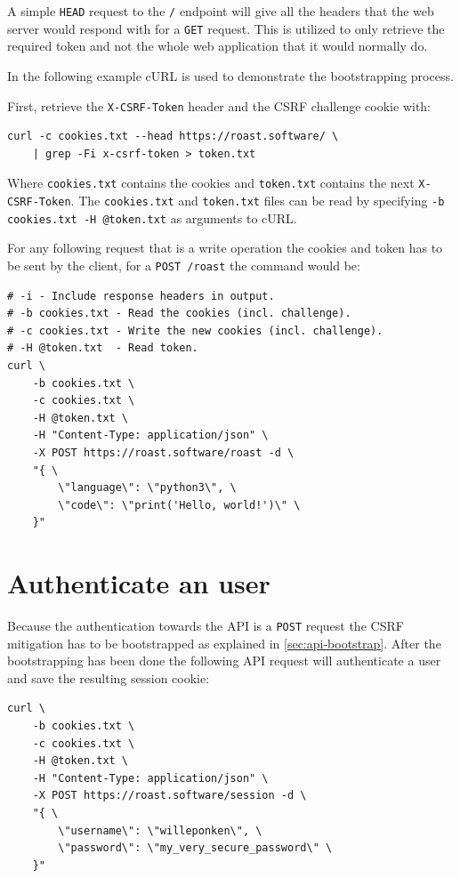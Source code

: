 \documentclass[12pt,a4paper]{report}
\begin{document}
A simple \texttt{HEAD} request to the \texttt{/} endpoint will give all the headers that the web server would respond with for a \texttt{GET} request. This is utilized to only retrieve the required token and not the whole web application that it would normally do.

In the following example cURL is used to demonstrate the bootstrapping process.

First, retrieve the \texttt{X-CSRF-Token} header and the CSRF challenge cookie with:
\begin{verbatim}
curl -c cookies.txt --head https://roast.software/ \
    | grep -Fi x-csrf-token > token.txt
\end{verbatim}
Where \texttt{cookies.txt} contains the cookies and \texttt{token.txt} contains the next \texttt{X-CSRF-Token}.
The \texttt{cookies.txt} and \texttt{token.txt} files can be read by specifying \texttt{-b cookies.txt -H @token.txt} as arguments to cURL.

\newpage
For any following request that is a write operation the cookies and token has to be sent by the client, for a \texttt{POST /roast} the command would be:
\begin{verbatim}
# -i - Include response headers in output.
# -b cookies.txt - Read the cookies (incl. challenge).
# -c cookies.txt - Write the new cookies (incl. challenge).
# -H @token.txt  - Read token.
curl \
    -b cookies.txt \
    -c cookies.txt \
    -H @token.txt \
    -H "Content-Type: application/json" \
    -X POST https://roast.software/roast -d \
    "{ \
        \"language\": \"python3\", \
        \"code\": \"print('Hello, world!')\" \
    }"
\end{verbatim}

\section{Authenticate an user}
Because the authentication towards the API is a \texttt{POST} request the CSRF mitigation has to be bootstrapped as explained in \autoref{sec:api-bootstrap}. After the bootstrapping has been done the following API request will authenticate a user and save the resulting session cookie:
\begin{verbatim}
curl \
    -b cookies.txt \
    -c cookies.txt \
    -H @token.txt \
    -H "Content-Type: application/json" \
    -X POST https://roast.software/session -d \
    "{ \
        \"username\": \"willeponken\", \
        \"password\": \"my_very_secure_password\" \
    }"
\end{verbatim}
\end{document}
